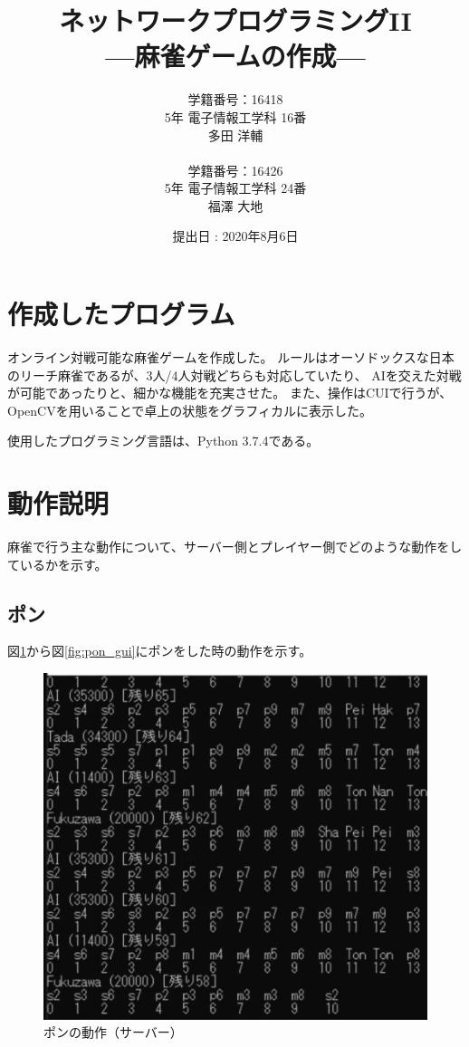 \documentclass[a4j,titlepage]{jsarticle}
\begin{document}
\begin{titlepage}
  \title{\huge{ネットワークプログラミングI\hspace{-.1em}I} \\ \LARGE{---麻雀ゲームの作成---}}
  \author{
    学籍番号：16418 \\ 5年 電子情報工学科 16番 \\ 多田 洋輔 \\ \\
    学籍番号：16426 \\ 5年 電子情報工学科 24番 \\ 福澤 大地
  }
	\date{提出日 : 2020年8月6日}
  \maketitle
\end{titlepage}


\section{作成したプログラム}
オンライン対戦可能な麻雀ゲームを作成した。
ルールはオーソドックスな日本のリーチ麻雀であるが、3人/4人対戦どちらも対応していたり、
AIを交えた対戦が可能であったりと、細かな機能を充実させた。
また、操作はCUIで行うが、OpenCVを用いることで卓上の状態をグラフィカルに表示した。

使用したプログラミング言語は、Python 3.7.4である。


\section{動作説明}
麻雀で行う主な動作について、サーバー側とプレイヤー側でどのような動作をしているかを示す。

\subsection{ポン}
図\ref{fig:pon_server}から図\ref{fig:pon_gui}にポンをした時の動作を示す。

\begin{figure}[htbp]
  \centering
  \includegraphics[width = 0.8\linewidth]{images/pon_server.png}
  \caption{ポンの動作（サーバー）}
  \label{fig:pon_server}
\end{figure}
\end{document}
